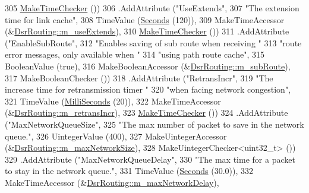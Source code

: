 \begin{DoxyCode}
305                    \hyperlink{group__time_ga7032965bd4afa578691d88c09e4481c1}{MakeTimeChecker} ())
306     .AddAttribute (\textcolor{stringliteral}{"UseExtends"},
307                    \textcolor{stringliteral}{"The extension time for link cache"},
308                    TimeValue (\hyperlink{group__timecivil_ga33c34b816f8ff6628e33d5c8e9713b9e}{Seconds} (120)),
309                    MakeTimeAccessor (&\hyperlink{classns3_1_1dsr_1_1DsrRouting_aa0a73bc163b0b32c84a5913ebbb62dc5}{DsrRouting::m\_useExtends}),
310                    \hyperlink{group__time_ga7032965bd4afa578691d88c09e4481c1}{MakeTimeChecker} ())
311     .AddAttribute (\textcolor{stringliteral}{"EnableSubRoute"},
312                    \textcolor{stringliteral}{"Enables saving of sub route when receiving "}
313                    \textcolor{stringliteral}{"route error messages, only available when "}
314                    \textcolor{stringliteral}{"using path route cache"},
315                    BooleanValue (\textcolor{keyword}{true}),
316                    MakeBooleanAccessor (&\hyperlink{classns3_1_1dsr_1_1DsrRouting_a83f7a7d54f8b078d987d46cf6edcd08e}{DsrRouting::m\_subRoute}),
317                    MakeBooleanChecker ())
318     .AddAttribute (\textcolor{stringliteral}{"RetransIncr"},
319                    \textcolor{stringliteral}{"The increase time for retransmission timer "}
320                    \textcolor{stringliteral}{"when facing network congestion"},
321                    TimeValue (\hyperlink{group__timecivil_gaf26127cf4571146b83a92ee18679c7a9}{MilliSeconds} (20)),
322                    MakeTimeAccessor (&\hyperlink{classns3_1_1dsr_1_1DsrRouting_a49d8f2c59b9e8bcd6cb57cb302eac47b}{DsrRouting::m\_retransIncr}),
323                    \hyperlink{group__time_ga7032965bd4afa578691d88c09e4481c1}{MakeTimeChecker} ())
324     .AddAttribute (\textcolor{stringliteral}{"MaxNetworkQueueSize"},
325                    \textcolor{stringliteral}{"The max number of packet to save in the network queue."},
326                    UintegerValue (400),
327                    MakeUintegerAccessor (&\hyperlink{classns3_1_1dsr_1_1DsrRouting_ab2edb0a37a59600e15dbb91b5683ad25}{DsrRouting::m\_maxNetworkSize}),
328                    MakeUintegerChecker<uint32\_t> ())
329     .AddAttribute (\textcolor{stringliteral}{"MaxNetworkQueueDelay"},
330                    \textcolor{stringliteral}{"The max time for a packet to stay in the network queue."},
331                    TimeValue (\hyperlink{group__timecivil_ga33c34b816f8ff6628e33d5c8e9713b9e}{Seconds} (30.0)),
332                    MakeTimeAccessor (&\hyperlink{classns3_1_1dsr_1_1DsrRouting_a5bf0e688251f1587471745f4355203c1}{DsrRouting::m\_maxNetworkDelay}),

\end{DoxyCode}

